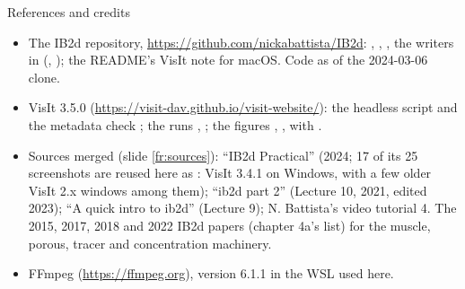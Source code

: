 \documentclass[aspectratio=169,11pt]{beamer}
\begin{document}
\begin{frame}{References and credits}
\label{fr:refs}
\scriptsize
\begin{itemize}
  \item The IB2d repository, \url{https://github.com/nickabattista/IB2d}: , , , the writers in  (, ); the README's VisIt note for macOS. Code as of the 2024-03-06 clone.
  \item VisIt 3.5.0 (\url{https://visit-dav.github.io/visit-website/}): the headless script  and the metadata check ; the runs , ; the figures , , with .
  \item Sources merged (slide \ref{fr:sources}): ``IB2d Practical'' (2024; 17 of its 25 screenshots are reused here as : VisIt 3.4.1 on Windows, with a few older VisIt 2.x windows among them); ``ib2d part 2'' (Lecture 10, 2021, edited 2023); ``A quick intro to ib2d'' (Lecture 9); N. Battista's video tutorial 4. The 2015, 2017, 2018 and 2022 IB2d papers (chapter 4a's list) for the muscle, porous, tracer and concentration machinery.
  \item FFmpeg (\url{https://ffmpeg.org}), version 6.1.1 in the WSL used here.
\end{itemize}
\end{frame}
\end{document}
